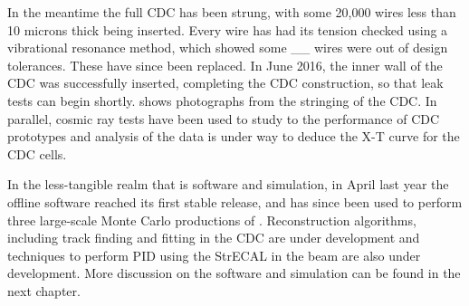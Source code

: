 \FigStatusCyDet
In the meantime the full \ac{CDC} has been strung, with some 20,000 wires less than 10 microns thick  being inserted.
Every wire has had its tension checked using a vibrational resonance method, which showed some \_\_  wires were out of design tolerances.  These have since been replaced.
In June 2016, the inner wall of the CDC was successfully inserted, completing the CDC construction, so that leak tests can begin shortly.  
 shows photographs from the stringing of the \ac{CDC}.
In parallel, cosmic ray tests have been used to study to the performance of CDC prototypes and analysis of the data is under way to deduce the X-T curve for the CDC cells.

In the less-tangible realm that is software and simulation, in April last year the offline software reached its first stable release, and has since been used to perform three large-scale Monte Carlo productions of \phaseI.
Reconstruction algorithms, including track finding and fitting in the \ac{CDC} are under development and techniques to perform \ac{PID} using the \ac{StrECAL} in the \phaseI beam are also under development.
More discussion on the software and simulation can be found in the next chapter.

